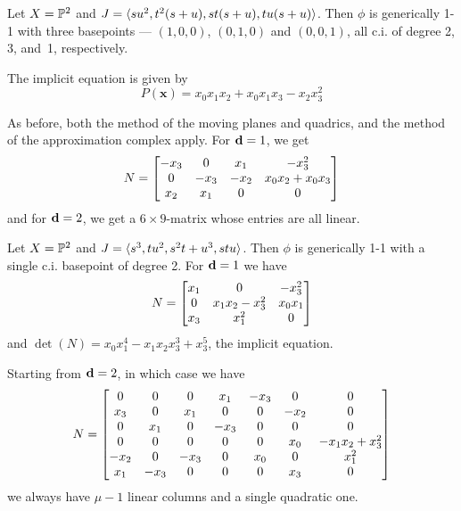 \documentclass[fleqn,reqno]{amsart}
\begin{document}
\begin{example}[$\mt{ex304}$]
\label{ex304}
Let $X=\mathbb{P}^2$ and $J=\langle su^2,t^2(s+u),st(s+u),tu(s+u)\rangle$.
Then $\phi$ is generically 1-1 with three basepoints --- $(1,0,0)$, $(0,1,0)$ and $(0,0,1)$,
all c.i. of degree 2, 3, and~1, respectively.

The implicit equation is given by
\[
	P(\mathbf x)={x}_{0} {x}_{1} {x}_{2}+{x}_{0} {x}_{1} {x}_{3}-{x}_{2} {x}_{3}^{2}
\]

As before, both the method of the moving planes and quadrics,
and the method of the approximation complex apply.
For $\mathbf d=1$, we get
\[
	N=
	\bgroup\begin{bmatrix}{-{x}_{3}}&
      0&
      {x}_{1}&
      {-{x}_{3}^{2}}\\
      0&
      {-{x}_{3}}&
      {-{x}_{2}}&
      {x}_{0} {x}_{2}+{x}_{0} {x}_{3}\\
      {x}_{2}&
      {x}_{1}&
      0&
      0\\
      \end{bmatrix}\egroup
\]
and for $\mathbf d=2$, we get a $6\times 9$-matrix whose entries are all linear.
\end{example}

\begin{example}[$\mt{ex305}$]
\label{ex305}
Let $X=\mathbb{P}^2$ and $J=\langle s^3,tu^2,s^2t+u^3,stu\rangle$.
Then $\phi$ is generically 1-1 with a single c.i. basepoint of degree 2.
For $\mathbf d=1$ we have
\[
	N=
	\bgroup\begin{bmatrix}{x}_{1}&
      0&
      {-{x}_{3}^{2}}\\
      0&
      {x}_{1} {x}_{2}-{x}_{3}^{2}&
      {x}_{0} {x}_{1}\\
      {{x}_{3}}&
      {x}_{1}^{2}&
      0\\
      \end{bmatrix}\egroup
\]
and $\det(N)={x}_{0} {x}_{1}^{4}-{x}_{1} {x}_{2} {x}_{3}^{3}+{x}_{3}^{5}$,
the implicit equation.

Starting from $\mathbf d=2$, in which case we have
\[
	N=
	\bgroup\begin{bmatrix}0&
      0&
      0&
      {x}_{1}&
      {-{x}_{3}}&
      0&
      0\\
      {x}_{3}&
      0&
      {x}_{1}&
      0&
      0&
      {-{x}_{2}}&
      0\\
      0&
      {x}_{1}&
      0&
      {-{x}_{3}}&
      0&
      0&
      0\\
      0&
      0&
      0&
      0&
      0&
      {x}_{0}&
      -{x}_{1} {x}_{2}+{x}_{3}^{2}\\
      {-{x}_{2}}&
      0&
      {-{x}_{3}}&
      0&
      {x}_{0}&
      0&
      {x}_{1}^{2}\\
      {x}_{1}&
      {-{x}_{3}}&
      0&
      0&
      0&
      {x}_{3}&
      0\\
      \end{bmatrix}\egroup
\]
we always have $\mu-1$ linear columns and a single quadratic one.
\end{example}
\end{document}
